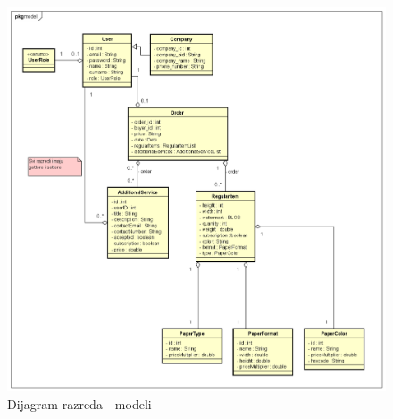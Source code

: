 			\begin{figure}[H]
				\includegraphics[scale=0.4]{dijagrami/dij_raz_model.PNG} 
				\centering
				\caption{Dijagram razreda - modeli}
				\label{fig:dij_raz4}%
			\end{figure}
			
			\eject
		
